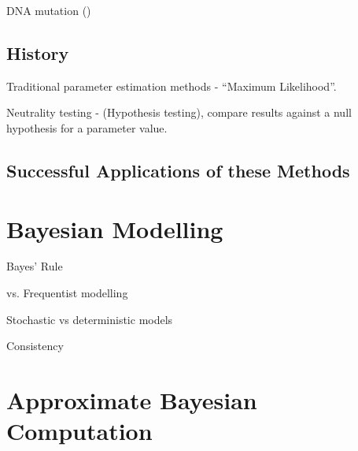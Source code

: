 \documentclass[11pt,a4paper,margin=0]{article}
\begin{document}
  \par DNA mutation (\cite{modern_computational_approaches_for_analysing_molecular_genetic_variation_data})

\subsection*{History}\label{sec_history}

  \par Traditional parameter estimation methods - ``Maximum Likelihood''.
  \par Neutrality testing - (Hypothesis testing), compare results against a null hypothesis for a parameter value.

\subsection*{Successful Applications of these Methods}\label{sec_successful_applications}

\section{Bayesian Modelling}

  \par Bayes' Rule
  \par vs. Frequentist modelling
  \par Stochastic vs deterministic models
  \par Consistency

\newpage
\section{Approximate Bayesian Computation}\label{sec_ABC}
\end{document}
